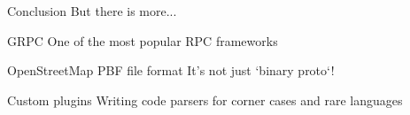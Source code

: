 \documentclass{beamer}
\begin{document}
\begin{frame}{Conclusion}
But there is more...
\end{frame}

\begin{frame}{GRPC}
One of the most popular RPC frameworks
\end{frame}

\begin{frame}{OpenStreetMap PBF file format}
It's not just `binary proto`!
\end{frame}

\begin{frame}{Custom plugins}
Writing code parsers for corner cases and rare languages
\end{frame}
\end{document}
